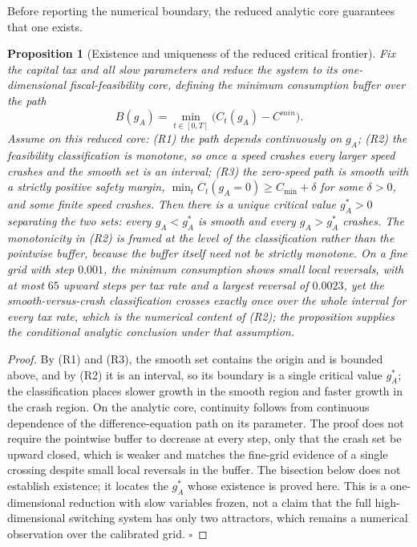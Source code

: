 \documentclass[review,12pt]{elsarticle}
\theoremstyle{plain}
\newtheorem{proposition}[theorem]{Proposition}
\theoremstyle{definition}
\theoremstyle{remark}
\begin{document}
Before reporting the numerical boundary, the reduced analytic core guarantees that one exists.
\begin{proposition}[Existence and uniqueness of the reduced critical frontier]
\label{prop:critical}
Fix the capital tax and all slow parameters and reduce the system to its one-dimensional fiscal-feasibility core, defining the minimum consumption buffer over the path
\[
B(g_A)=\min_{t\in[0,T]}\bigl(C_t(g_A)-C^{min}\bigr).
\]
Assume on this reduced core: (R1) the path depends continuously on $g_A$; (R2) the feasibility classification is monotone, so once a speed crashes every larger speed crashes and the smooth set is an interval; (R3) the zero-speed path is smooth with a strictly positive safety margin, $\min_t C_t(g_A=0)\ge C_{\min}+\delta$ for some $\delta>0$, and some finite speed crashes. Then there is a unique critical value $g_A^*>0$ separating the two sets: every $g_A<g_A^*$ is smooth and every $g_A>g_A^*$ crashes. The monotonicity in (R2) is framed at the level of the classification rather than the pointwise buffer, because the buffer itself need not be strictly monotone. On a fine grid with step $0.001$, the minimum consumption shows small local reversals, with at most $65$ upward steps per tax rate and a largest reversal of $0.0023$, yet the smooth-versus-crash classification crosses exactly once over the whole interval for every tax rate, which is the numerical content of (R2); the proposition supplies the conditional analytic conclusion under that assumption.
\end{proposition}
\begin{proof}
By (R1) and (R3), the smooth set contains the origin and is bounded above, and by (R2) it is an interval, so its boundary is a single critical value $g_A^*$; the classification places slower growth in the smooth region and faster growth in the crash region. On the analytic core, continuity follows from continuous dependence of the difference-equation path on its parameter. The proof does not require the pointwise buffer to decrease at every step, only that the crash set be upward closed, which is weaker and matches the fine-grid evidence of a single crossing despite small local reversals in the buffer. The bisection below does not establish existence; it locates the $g_A^*$ whose existence is proved here. This is a one-dimensional reduction with slow variables frozen, not a claim that the full high-dimensional switching system has only two attractors, which remains a numerical observation over the calibrated grid. $\square$
\end{proof}
\end{document}

